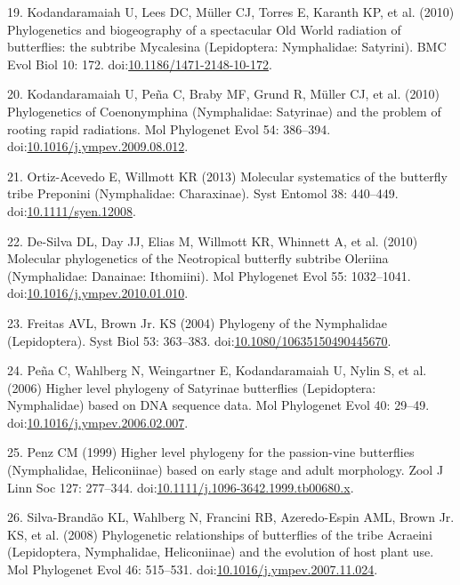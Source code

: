 \documentclass[10pt]{article}
\begin{document}
19. Kodandaramaiah U, Lees DC, M\"uller CJ, Torres E, Karanth KP, et al.
(2010) Phylogenetics and biogeography of a spectacular Old World
radiation of butterflies: the subtribe Mycalesina (Lepidoptera:
Nymphalidae: Satyrini). BMC Evol Biol 10: 172. 
doi:\href{http://dx.doi.org/10.1186/1471-2148-10-172}{10.1186/1471-2148-10-172}.

20. Kodandaramaiah U, Pe\~na C, Braby MF, Grund R, M\"uller CJ, et al.
(2010) Phylogenetics of Coenonymphina (Nymphalidae: Satyrinae) and the
problem of rooting rapid radiations. Mol Phylogenet Evol 54: 386--394.
doi:\href{http://dx.doi.org/10.1016/j.ympev.2009.08.012}{10.1016/j.ympev.2009.08.012}.

21. Ortiz-Acevedo E, Willmott KR (2013) Molecular systematics of the
butterfly tribe Preponini (Nymphalidae: Charaxinae). Syst Entomol 38:
440--449.
doi:\href{http://dx.doi.org/10.1111/syen.12008}{10.1111/syen.12008}.

22. De-Silva DL, Day JJ, Elias M, Willmott KR, Whinnett A, et al. (2010)
Molecular phylogenetics of the Neotropical butterfly subtribe Oleriina
(Nymphalidae: Danainae: Ithomiini). Mol Phylogenet Evol 55: 1032--1041.
doi:\href{http://dx.doi.org/10.1016/j.ympev.2010.01.010}{10.1016/j.ympev.2010.01.010}.

23. Freitas AVL, Brown Jr. KS (2004) Phylogeny of the Nymphalidae
(Lepidoptera). Syst Biol 53: 363--383.
doi:\href{http://dx.doi.org/10.1080/10635150490445670}{10.1080/10635150490445670}.

24. Pe\~na C, Wahlberg N, Weingartner E, Kodandaramaiah U, Nylin S, et al.
(2006) Higher level phylogeny of Satyrinae butterflies (Lepidoptera:
Nymphalidae) based on DNA sequence data. Mol Phylogenet Evol 40: 29--49.
doi:\href{http://dx.doi.org/10.1016/j.ympev.2006.02.007}{10.1016/j.ympev.2006.02.007}.

25. Penz CM (1999) Higher level phylogeny for the passion-vine
butterflies (Nymphalidae, Heliconiinae) based on early stage and adult
morphology. Zool J Linn Soc 127: 277--344.
doi:\href{http://dx.doi.org/10.1111/j.1096-3642.1999.tb00680.x}{10.1111/j.1096-3642.1999.tb00680.x}.

26. Silva-Brand\~ao KL, Wahlberg N, Francini RB, Azeredo-Espin AML, Brown
Jr. KS, et al. (2008) Phylogenetic relationships of butterflies of the
tribe Acraeini (Lepidoptera, Nymphalidae, Heliconiinae) and the
evolution of host plant use. Mol Phylogenet Evol 46: 515--531.
doi:\href{http://dx.doi.org/10.1016/j.ympev.2007.11.024}{10.1016/j.ympev.2007.11.024}.
\end{document}
